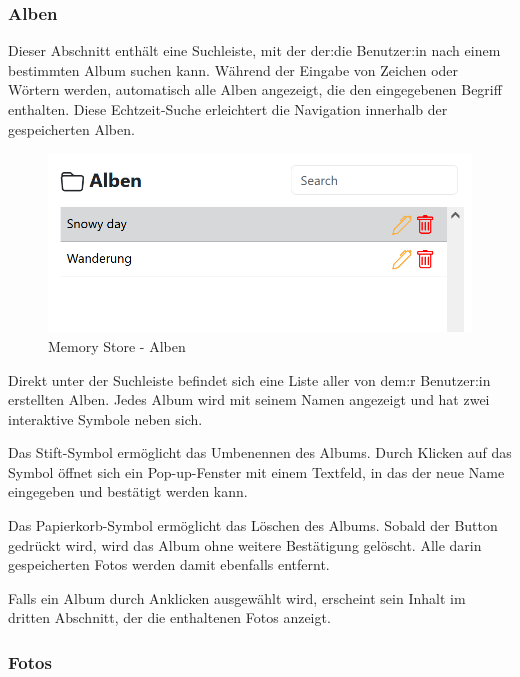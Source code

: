 \subsubsection{Alben}

Dieser Abschnitt enthält eine Suchleiste, mit der der:die Benutzer:in nach einem bestimmten Album suchen kann. Während der Eingabe von Zeichen oder Wörtern werden, automatisch alle Alben angezeigt, die den eingegebenen Begriff enthalten. Diese Echtzeit-Suche erleichtert die Navigation innerhalb der gespeicherten Alben.

\begin{figure}
    \centering
    \includegraphics[scale=0.5]{pics/memory_store_teil2.PNG}
    \caption{Memory Store - Alben}
    \label{fig:memory-store-alben}
\end{figure}

Direkt unter der Suchleiste befindet sich eine Liste aller von dem:r Benutzer:in erstellten Alben. Jedes Album wird mit seinem Namen angezeigt und hat zwei interaktive Symbole neben sich.

Das Stift-Symbol ermöglicht das Umbenennen des Albums. Durch Klicken auf das Symbol öffnet sich ein Pop-up-Fenster mit einem Textfeld, in das der neue Name eingegeben und bestätigt werden kann.

Das Papierkorb-Symbol ermöglicht das Löschen des Albums. Sobald der Button gedrückt wird, wird das Album ohne weitere Bestätigung gelöscht. Alle darin gespeicherten Fotos werden damit ebenfalls entfernt.

Falls ein Album durch Anklicken ausgewählt wird, erscheint sein Inhalt im dritten Abschnitt, der die enthaltenen Fotos anzeigt.

\subsubsection{Fotos}

